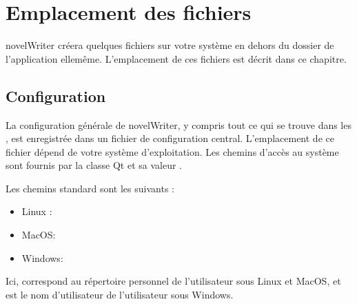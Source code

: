\documentclass[a4paper,11pt,french]{sphinxmanual}
\begin{document}
\sphinxstepscope


\chapter{Emplacement des fichiers}
\label{\detokenize{tech_locations:file-locations}}\label{\detokenize{tech_locations:a-locations}}\label{\detokenize{tech_locations::doc}}
\sphinxAtStartPar
novelWriter créera quelques fichiers sur votre système en dehors du dossier de l’application elle\sphinxhyphen{}même. L’emplacement de ces fichiers est décrit dans ce chapitre.


\section{Configuration}
\label{\detokenize{tech_locations:configuration}}\label{\detokenize{tech_locations:a-locations-conf}}
\sphinxAtStartPar
La configuration générale de novelWriter, y compris tout ce qui se trouve dans les , est enregistrée dans un fichier de configuration central. L’emplacement de ce fichier dépend de votre système d’exploitation. Les chemins d’accès au système sont fournis par la classe Qt  et sa valeur .

\sphinxAtStartPar
Les chemins standard sont les suivants :
\begin{itemize}
\item {} 
\sphinxAtStartPar
Linux : 

\item {} 
\sphinxAtStartPar
MacOS: 

\item {} 
\sphinxAtStartPar
Windows: 

\end{itemize}

\sphinxAtStartPar
Ici, \sphinxcode{\sphinxupquote{\textasciitilde{}}} correspond au répertoire personnel de l’utilisateur sous Linux et MacOS, et  est le nom d’utilisateur de l’utilisateur sous Windows.
\end{document}
